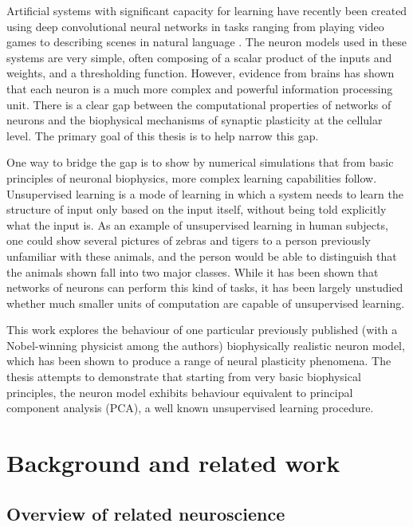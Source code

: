 \documentclass[a4paper,12pt]{report}
\theoremstyle{definition}
\begin{document}
Artificial systems with significant capacity for learning have recently been created using deep convolutional neural networks in tasks ranging from playing video games \cite{mnih2015human} to describing scenes in natural language \cite{karpathy2014deep}. The neuron models used in these systems are very simple, often composing of a scalar product of the inputs and weights, and a thresholding function. However, evidence from brains has shown that each neuron is a much more complex and powerful information processing unit. There is a clear gap between the computational properties of networks of neurons and the biophysical mechanisms of synaptic plasticity at the cellular level. The primary goal of this thesis is to help narrow this gap.

One way to bridge the gap is to show by numerical simulations that from basic principles of neuronal biophysics, more complex learning capabilities follow. Unsupervised learning is a mode of learning in which a system needs to learn the structure of input only based on the input itself, without being told explicitly what the input is. As an example of unsupervised learning in human subjects, one could show several pictures of zebras and tigers to a person previously unfamiliar with these animals, and the person would be able to distinguish that the animals shown fall into two major classes. While it has been shown that networks of neurons can perform this kind of tasks, it has been largely unstudied whether much smaller units of computation are capable of unsupervised learning.

This work explores the behaviour of one particular previously published (with a Nobel-winning physicist among the authors) biophysically realistic neuron model, which has been shown to produce a range of neural plasticity phenomena. The thesis attempts to demonstrate that starting from very basic biophysical principles, the neuron model exhibits behaviour equivalent to principal component analysis (PCA), a well known unsupervised learning procedure.


\chapter{Background and related work}


\section{Overview of related neuroscience}
\end{document}
